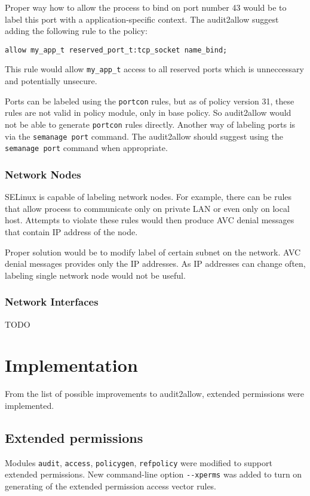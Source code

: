 Proper way how to allow the process to bind on port number 43 would be to label
this port with a application-specific context. The audit2allow suggest adding
the following rule to the policy:
\begin{lstlisting}
allow my_app_t reserved_port_t:tcp_socket name_bind;
\end{lstlisting}
This rule would allow \texttt{my\_app\_t} access to all reserved ports which is
unneccessary and potentially unsecure.

Ports can be labeled using the \texttt{portcon} rules, but as of policy version
31, these rules are not valid in policy module, only in base policy. So
audit2allow would not be able to generate \texttt{portcon} rules directly.
Another way of labeling ports is via the \texttt{semanage port} command. The
audit2allow should suggest using the \texttt{semanage port} command when
appropriate.

\subsection{Network Nodes}
SELinux is capable of labeling network nodes. For example, there can be rules
that allow process to communicate only on private LAN or even only on local
host. Attempts to violate these rules would then produce AVC denial messages
that contain IP address of the node.

Proper solution would be to modify label of certain subnet on the network. AVC
denial messages provides only the IP addresses. As IP addresses can change
often, labeling single network node would not be useful.

\subsection{Network Interfaces}
TODO

\chapter{Implementation}
From the list of possible improvements to audit2allow, extended permissions were
implemented.

\section{Extended permissions}
Modules \texttt{audit}, \texttt{access}, \texttt{policygen}, \texttt{refpolicy}
were modified to support extended permissions. New command-line option
\texttt{-{}-xperms} was added to turn on generating of the extended permission
access vector rules.

